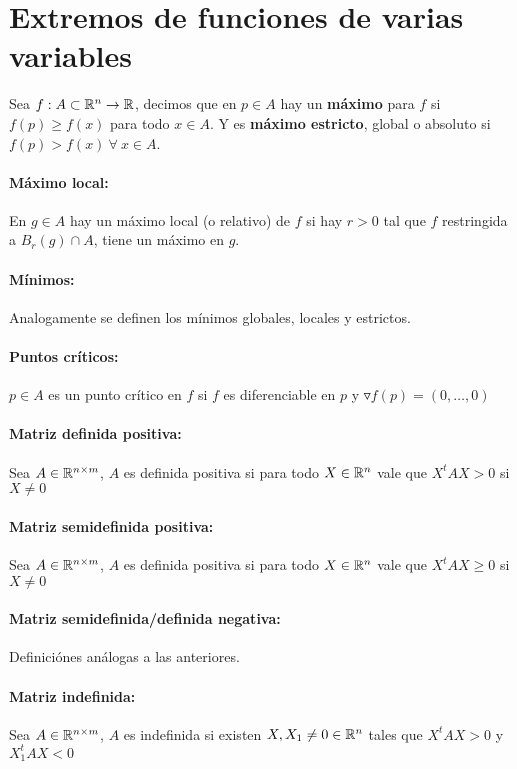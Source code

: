 \section{Extremos de funciones de varias variables}
Sea $f:A\subset\mathbb{R}^n\to\mathbb{R}$, decimos que en $p\in A$ hay un \textbf{máximo} para $f$ si $f(p)\geq f(x)$ para todo $x\in A$. Y es \textbf{máximo estricto}, global o absoluto si $f(p) > f(x)~\forall~x\in A$.

\paragraph{Máximo local:} En $g\in A$ hay un máximo local (o relativo) de $f$ si hay $r>0$ tal que $f$ restringida a $B_r(g)\cap A$, tiene un máximo en $g$.

\paragraph{Mínimos:} Analogamente se definen los mínimos globales, locales y estrictos.

\paragraph{Puntos críticos:} $p\in A$ es un punto crítico en $f$ si $f$ es diferenciable en $p$ y $\triangledown f(p) = (0,\dots,0)$

\paragraph{Matriz definida positiva:} Sea $A\in\mathbb{R}^{n\times m}$, $A$ es definida positiva si para todo $X\in\mathbb{R}^n$ vale que $X^tAX>0$ si $X\neq 0$

\paragraph{Matriz semidefinida positiva:} Sea $A\in\mathbb{R}^{n\times m}$, $A$ es definida positiva si para todo $X\in\mathbb{R}^n$ vale que $X^tAX\geq 0$ si $X\neq 0$

\paragraph{Matriz semidefinida/definida negativa:} Definiciónes análogas a las anteriores.

\paragraph{Matriz indefinida: } Sea $A\in\mathbb{R}^{n\times m}$, $A$ es indefinida si existen $X, X_1\neq 0\in\mathbb{R}^n$ tales que $X^tAX>0$ y $X_1^tAX<0$

